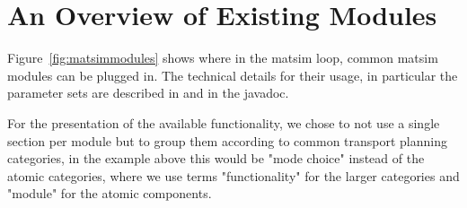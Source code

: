 


\section{An Overview of Existing Modules}
Figure~\ref{fig:matsimmodules} shows where in the \gls{matsim} loop, common \gls{matsim} modules can be plugged in. The technical details for their usage, in particular the parameter sets are described in \citep[][]{MATSim_Userguide_2014} and in the javadoc.

For the presentation of the available functionality, we chose to not use a single section per module but to group them according to common transport planning categories, in the example above this would be "mode choice" instead of the atomic categories, where we use terms "functionality" for the larger categories and "module" for the atomic components. %


